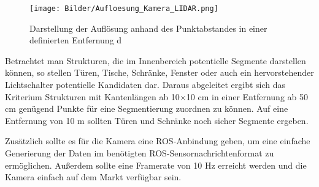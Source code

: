 \begin{figure}
	\centering
	\texttt{[image: Bilder/Aufloesung\_Kamera\_LIDAR.png]}
	\caption{Darstellung der Auflösung anhand des Punktabstandes in einer definierten Entfernung d}
	\label{fig:Auflösung}
\end{figure}

Betrachtet man Strukturen, die im Innenbereich potentielle Segmente darstellen können, so stellen Türen, Tische, Schränke, Fenster oder auch ein hervorstehender Lichtschalter potentielle Kandidaten dar. Daraus abgeleitet ergibt sich das Kriterium Strukturen mit Kantenlängen ab 10$\times$10 cm in einer Entfernung ab 50 cm genügend Punkte für eine Segmentierung zuordnen zu können. Auf eine Entfernung von 10 m sollten Türen und Schränke noch sicher Segmente ergeben. 

Zusätzlich sollte es für die Kamera eine ROS-Anbindung geben, um eine einfache Generierung der Daten im benötigten ROS-Sensornachrichtenformat zu ermöglichen. Außerdem sollte eine Framerate von 10 Hz erreicht werden und die Kamera einfach auf dem Markt verfügbar sein. 


